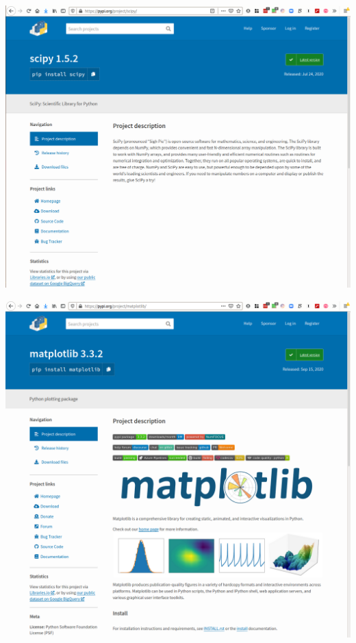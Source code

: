 \begin{frame}
  \includegraphics[width=\columnwidth]{figs/pypi-scipy.png}
\end{frame}

\begin{frame}
  \includegraphics[width=\columnwidth]{figs/pypi-matplotlib.png}
\end{frame}

